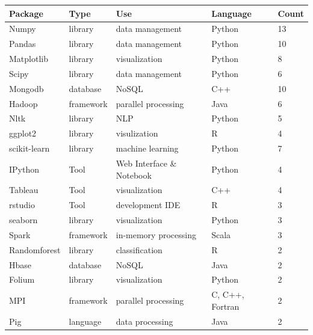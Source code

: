 \documentclass[9pt,twocolumn,twoside]{styles/osajnl}
\begin{document}
\begin{table}[htb]
  \begin{center}
    \begin{small}
        \begin{tabular}{l|l|m{1.5cm}|m{1.5cm}|l}

    Package      & Type      & Use                       & Language        & Count\tnote{*} \\ \hline \hline
    Numpy        & library   & data management           & Python          & 13             \\ \hline
    Pandas       & library   & data management           & Python          & 10             \\ \hline
    Matplotlib   & library   & visualization             & Python          & 8              \\ \hline
    Scipy        & library   & data management           & Python          & 6              \\ \hline
    Mongodb      & database  & NoSQL                     & C++             & 10             \\ \hline
    Hadoop       & framework & parallel processing       & Java            & 6              \\ \hline
    Nltk         & library   & NLP                       & Python          & 5              \\ \hline
    ggplot2      & library   & visulization              & R               & 4              \\ \hline
    scikit-learn & library   & machine learning          & Python          & 7              \\ \hline
    IPython      & Tool      & Web Interface \& Notebook & Python          & 4              \\ \hline
    Tableau      & Tool      & visualization             & C++             & 4              \\ \hline
    rstudio      & Tool      & development IDE           & R               & 3              \\ \hline
    seaborn      & library   & visualization             & Python          & 3              \\ \hline
    Spark        & framework & in-memory processing      & Scala           & 3              \\ \hline
    Randomforest & library   & classification            & R               & 2              \\ \hline
    Hbase        & database  & NoSQL                     & Java            & 2              \\ \hline
    Folium       & library   & visualization             & Python          & 2              \\ \hline
    MPI          & framework & parallel processing       & C, C++, Fortran & 2              \\ \hline
    Pig          & language  & data processing           & Java            & 2              \\ 


\end{tabular}
\end{small}
\end{center}
\end{table}
\end{document}
